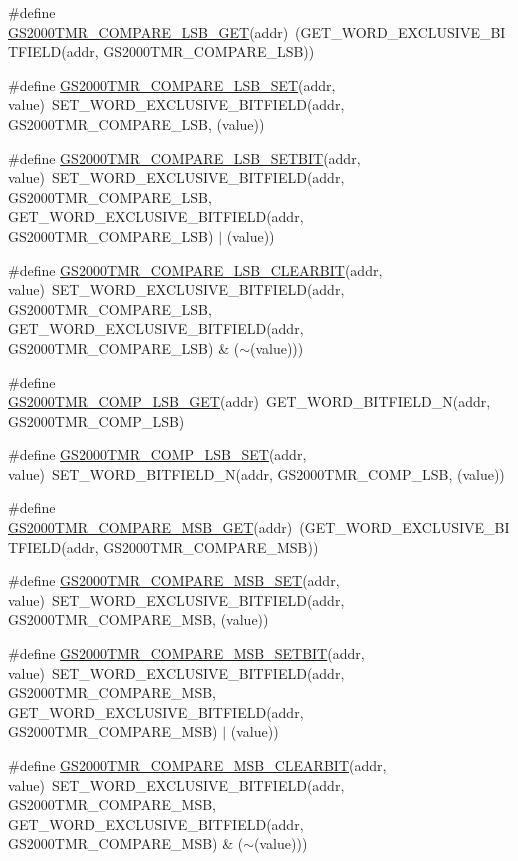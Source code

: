 \begin{DoxyCompactItemize}
\#define \hyperlink{a00555_ac37969395a3ed89d8d0dcb03c0e0d8e3}{GS2000TMR\_\-COMPARE\_\-LSB\_\-GET}(addr)~(GET\_\-WORD\_\-EXCLUSIVE\_\-BITFIELD(addr, GS2000TMR\_\-COMPARE\_\-LSB))
\item 
\#define \hyperlink{a00555_a0d5ece214f6fa7e590d012422b7dc75d}{GS2000TMR\_\-COMPARE\_\-LSB\_\-SET}(addr, value)~SET\_\-WORD\_\-EXCLUSIVE\_\-BITFIELD(addr, GS2000TMR\_\-COMPARE\_\-LSB, (value))
\item 
\#define \hyperlink{a00555_a3a240e6550d4e142d411bc1eb4872fbb}{GS2000TMR\_\-COMPARE\_\-LSB\_\-SETBIT}(addr, value)~SET\_\-WORD\_\-EXCLUSIVE\_\-BITFIELD(addr, GS2000TMR\_\-COMPARE\_\-LSB, GET\_\-WORD\_\-EXCLUSIVE\_\-BITFIELD(addr, GS2000TMR\_\-COMPARE\_\-LSB) $|$ (value))
\item 
\#define \hyperlink{a00555_a9e11102d98a0c5d5ce81a62b1ec5825a}{GS2000TMR\_\-COMPARE\_\-LSB\_\-CLEARBIT}(addr, value)~SET\_\-WORD\_\-EXCLUSIVE\_\-BITFIELD(addr, GS2000TMR\_\-COMPARE\_\-LSB, GET\_\-WORD\_\-EXCLUSIVE\_\-BITFIELD(addr, GS2000TMR\_\-COMPARE\_\-LSB) \& ($\sim$(value)))
\item 
\#define \hyperlink{a00555_ae4774e096dc740d4aa0cdd6eae8307ce}{GS2000TMR\_\-COMP\_\-LSB\_\-GET}(addr)~GET\_\-WORD\_\-BITFIELD\_\-N(addr, GS2000TMR\_\-COMP\_\-LSB)
\item 
\#define \hyperlink{a00555_a3bd2f5a56abb22256f44a1ed21807a6e}{GS2000TMR\_\-COMP\_\-LSB\_\-SET}(addr, value)~SET\_\-WORD\_\-BITFIELD\_\-N(addr, GS2000TMR\_\-COMP\_\-LSB, (value))
\item 
\#define \hyperlink{a00555_ad6916c15ab1ca076e16bc3072447a39e}{GS2000TMR\_\-COMPARE\_\-MSB\_\-GET}(addr)~(GET\_\-WORD\_\-EXCLUSIVE\_\-BITFIELD(addr, GS2000TMR\_\-COMPARE\_\-MSB))
\item 
\#define \hyperlink{a00555_ae607e49b9826daa219225cb7269750e8}{GS2000TMR\_\-COMPARE\_\-MSB\_\-SET}(addr, value)~SET\_\-WORD\_\-EXCLUSIVE\_\-BITFIELD(addr, GS2000TMR\_\-COMPARE\_\-MSB, (value))
\item 
\#define \hyperlink{a00555_a90aacbff909a79b07b4ae30a1d050419}{GS2000TMR\_\-COMPARE\_\-MSB\_\-SETBIT}(addr, value)~SET\_\-WORD\_\-EXCLUSIVE\_\-BITFIELD(addr, GS2000TMR\_\-COMPARE\_\-MSB, GET\_\-WORD\_\-EXCLUSIVE\_\-BITFIELD(addr, GS2000TMR\_\-COMPARE\_\-MSB) $|$ (value))
\item 
\#define \hyperlink{a00555_a47895966f68a992ddb25d2e9a02f840d}{GS2000TMR\_\-COMPARE\_\-MSB\_\-CLEARBIT}(addr, value)~SET\_\-WORD\_\-EXCLUSIVE\_\-BITFIELD(addr, GS2000TMR\_\-COMPARE\_\-MSB, GET\_\-WORD\_\-EXCLUSIVE\_\-BITFIELD(addr, GS2000TMR\_\-COMPARE\_\-MSB) \& ($\sim$(value)))

\end{DoxyCompactItemize}
